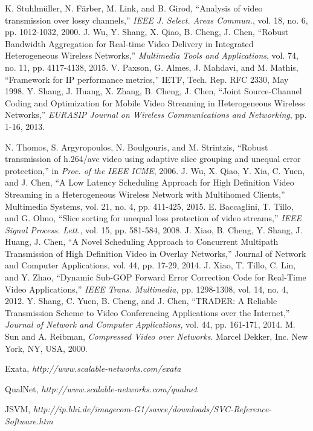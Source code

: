 \documentclass[journal]{IEEEtran}
\begin{document}
\begin{thebibliography}{1}
K. Stuhlm\"{u}ller, N. F\"{a}rber, M. Link, and B. Girod, ``Analysis of video transmission over lossy channels,'' \emph{IEEE J. Select. Areas Commun.}, vol. 18, no. 6, pp. 1012-1032, 2000.
J. Wu, Y. Shang, X. Qiao, B. Cheng, J. Chen, ``Robust Bandwidth Aggregation for Real-time Video Delivery in Integrated Heterogeneous Wireless Networks,'' \emph{Multimedia Tools and Applications}, vol. 74, no. 11, pp. 4117-4138, 2015.
V. Paxson, G. Almes, J. Mahdavi, and M. Mathis, ``Framework for IP performance metrics,'' IETF, Tech. Rep. RFC 2330, May 1998.
Y. Shang, J. Huang, X. Zhang, B. Cheng, J. Chen, ``Joint Source-Channel Coding and Optimization for Mobile Video Streaming in Heterogeneous Wireless Networks,''\emph{ EURASIP Journal on Wireless Communications and Networking}, pp. 1-16, 2013.

N. Thomos, S. Argyropoulos, N. Boulgouris, and M. Strintzis, ``Robust transmission of h.264/avc video using adaptive slice grouping and unequal error protection,'' in \emph{Proc. of the IEEE ICME}, 2006.
J. Wu, X. Qiao, Y. Xia, C. Yuen, and J. Chen, ``A Low Latency Scheduling Approach for High Definition Video Streaming in a Heterogeneous Wireless Network with Multihomed Clients,'' Multimedia Systems, vol. 21, no. 4, pp. 411-425, 2015.
E. Baccaglini, T. Tillo, and G. Olmo, ``Slice sorting for unequal loss protection of video streams,'' \emph{IEEE Signal Process. Lett.}, vol. 15, pp. 581-584, 2008.
J. Xiao, B. Cheng, Y. Shang, J. Huang, J. Chen, ``A Novel Scheduling Approach to Concurrent Multipath Transmission of High Definition Video in Overlay Networks,'' Journal of Network and Computer Applications, vol. 44, pp. 17-29, 2014.
J. Xiao, T. Tillo, C. Lin, and Y. Zhao, ``Dynamic Sub-GOP Forward Error Correction Code for Real-Time Video Applications,'' \emph{IEEE Trans. Multimedia,} pp. 1298-1308, vol. 14, no. 4, 2012.
Y. Shang, C. Yuen, B. Cheng, and J. Chen, ``TRADER: A Reliable Transmission Scheme to Video Conferencing Applications over the Internet,'' \emph{Journal of Network and Computer Applications}, vol. 44, pp. 161-171, 2014.
M. Sun and A. Reibman, \emph{Compressed Video over Networks}. Marcel Dekker, Inc. New York, NY, USA, 2000.

Exata, \emph{http://www.scalable-networks.com/exata}

QualNet, \emph{http://www.scalable-networks.com/qualnet}

JSVM, \emph{http://ip.hhi.de/imagecom-G1/savce/downloads/SVC-Reference-Software.htm}

\end{thebibliography}
\end{document}
